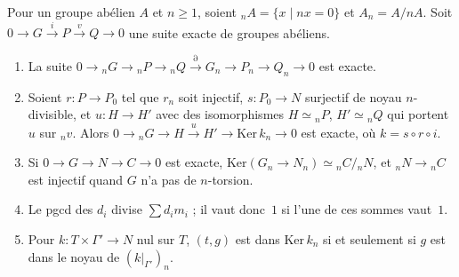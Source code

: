 \begin{encadre}
\begin{enonce}
Pour un groupe abélien $A$ et $n \geq 1$, soient ${}_nA = \{x \mid nx = 0\}$ et $A_n = A/nA$. Soit $0 \to G \xrightarrow{i} P \xrightarrow{v} Q \to 0$ une suite exacte de groupes abéliens.
\begin{enumerate}
\item La suite $0 \to {}_nG \to {}_nP \to {}_nQ \xrightarrow{\partial} G_n \to P_n \to Q_n \to 0$ est exacte.
\item Soient $r : P \to P_0$ tel que $r_n$ soit injectif, $s : P_0 \to N$ surjectif de noyau $n$-divisible, et $u : H \to H'$ avec des isomorphismes $H \simeq {}_nP$, $H' \simeq {}_nQ$ qui portent $u$ sur ${}_nv$. Alors $0 \to {}_nG \to H \xrightarrow{u} H' \to \mathrm{Ker}\,k_n \to 0$ est exacte, où $k = s \circ r \circ i$.
\item Si $0 \to G \to N \to C \to 0$ est exacte, $\mathrm{Ker}(G_n \to N_n) \simeq {}_nC/{}_nN$, et ${}_nN \to {}_nC$ est injectif quand $G$ n'a pas de $n$-torsion.
\item Le pgcd des $d_i$ divise $\sum d_i m_i$ ; il vaut donc~$1$ si l'une de ces sommes vaut~$1$.
\item Pour $k : T \times \Gamma' \to N$ nul sur $T$, $(t, g)$ est dans $\mathrm{Ker}\,k_n$ si et seulement si $g$ est dans le noyau de $(k|_{\Gamma'})_n$.
\end{enumerate}
\end{enonce}
\end{encadre}

